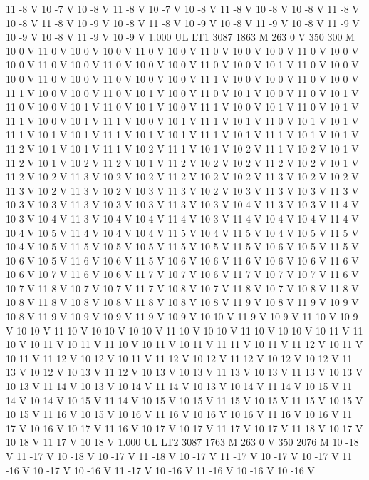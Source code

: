 {{11 -8 V
10 -7 V
10 -8 V
11 -8 V
10 -7 V
10 -8 V
11 -8 V
10 -8 V
10 -8 V
11 -8 V
10 -8 V
11 -8 V
10 -9 V
10 -8 V
11 -8 V
10 -9 V
10 -8 V
11 -9 V
10 -8 V
11 -9 V
10 -9 V
10 -8 V
11 -9 V
10 -9 V
1.000 UL
LT1
3087 1863 M
263 0 V
350 300 M
10 0 V
11 0 V
10 0 V
10 0 V
11 0 V
10 0 V
11 0 V
10 0 V
10 0 V
11 0 V
10 0 V
10 0 V
11 0 V
10 0 V
11 0 V
10 0 V
10 0 V
11 0 V
10 0 V
10 1 V
11 0 V
10 0 V
10 0 V
11 0 V
10 0 V
11 0 V
10 0 V
10 0 V
11 1 V
10 0 V
10 0 V
11 0 V
10 0 V
11 1 V
10 0 V
10 0 V
11 0 V
10 1 V
10 0 V
11 0 V
10 1 V
10 0 V
11 0 V
10 1 V
11 0 V
10 0 V
10 1 V
11 0 V
10 1 V
10 0 V
11 1 V
10 0 V
10 1 V
11 0 V
10 1 V
11 1 V
10 0 V
10 1 V
11 1 V
10 0 V
10 1 V
11 1 V
10 1 V
11 0 V
10 1 V
10 1 V
11 1 V
10 1 V
10 1 V
11 1 V
10 1 V
10 1 V
11 1 V
10 1 V
11 1 V
10 1 V
10 1 V
11 2 V
10 1 V
10 1 V
11 1 V
10 2 V
11 1 V
10 1 V
10 2 V
11 1 V
10 2 V
10 1 V
11 2 V
10 1 V
10 2 V
11 2 V
10 1 V
11 2 V
10 2 V
10 2 V
11 2 V
10 2 V
10 1 V
11 2 V
10 2 V
11 3 V
10 2 V
10 2 V
11 2 V
10 2 V
10 2 V
11 3 V
10 2 V
10 2 V
11 3 V
10 2 V
11 3 V
10 2 V
10 3 V
11 3 V
10 2 V
10 3 V
11 3 V
10 3 V
11 3 V
10 3 V
10 3 V
11 3 V
10 3 V
10 3 V
11 3 V
10 3 V
10 4 V
11 3 V
10 3 V
11 4 V
10 3 V
10 4 V
11 3 V
10 4 V
10 4 V
11 4 V
10 3 V
11 4 V
10 4 V
10 4 V
11 4 V
10 4 V
10 5 V
11 4 V
10 4 V
10 4 V
11 5 V
10 4 V
11 5 V
10 4 V
10 5 V
11 5 V
10 4 V
10 5 V
11 5 V
10 5 V
10 5 V
11 5 V
10 5 V
11 5 V
10 6 V
10 5 V
11 5 V
10 6 V
10 5 V
11 6 V
10 6 V
11 5 V
10 6 V
10 6 V
11 6 V
10 6 V
10 6 V
11 6 V
10 6 V
10 7 V
11 6 V
10 6 V
11 7 V
10 7 V
10 6 V
11 7 V
10 7 V
10 7 V
11 6 V
10 7 V
11 8 V
10 7 V
10 7 V
11 7 V
10 8 V
10 7 V
11 8 V
10 7 V
10 8 V
11 8 V
10 8 V
11 8 V
10 8 V
10 8 V
11 8 V
10 8 V
10 8 V
11 9 V
10 8 V
11 9 V
10 9 V
10 8 V
11 9 V
10 9 V
10 9 V
11 9 V
10 9 V
10 10 V
11 9 V
10 9 V
11 10 V
10 9 V
10 10 V
11 10 V
10 10 V
10 10 V
11 10 V
10 10 V
11 10 V
10 10 V
10 11 V
11 10 V
10 11 V
10 11 V
11 10 V
10 11 V
10 11 V
11 11 V
10 11 V
11 12 V
10 11 V
10 11 V
11 12 V
10 12 V
10 11 V
11 12 V
10 12 V
11 12 V
10 12 V
10 12 V
11 13 V
10 12 V
10 13 V
11 12 V
10 13 V
10 13 V
11 13 V
10 13 V
11 13 V
10 13 V
10 13 V
11 14 V
10 13 V
10 14 V
11 14 V
10 13 V
10 14 V
11 14 V
10 15 V
11 14 V
10 14 V
10 15 V
11 14 V
10 15 V
10 15 V
11 15 V
10 15 V
11 15 V
10 15 V
10 15 V
11 16 V
10 15 V
10 16 V
11 16 V
10 16 V
10 16 V
11 16 V
10 16 V
11 17 V
10 16 V
10 17 V
11 16 V
10 17 V
10 17 V
11 17 V
10 17 V
11 18 V
10 17 V
10 18 V
11 17 V
10 18 V
1.000 UL
LT2
3087 1763 M
263 0 V
350 2076 M
10 -18 V
11 -17 V
10 -18 V
10 -17 V
11 -18 V
10 -17 V
11 -17 V
10 -17 V
10 -17 V
11 -16 V
10 -17 V
10 -16 V
11 -17 V
10 -16 V
11 -16 V
10 -16 V
10 -16 V
}}
